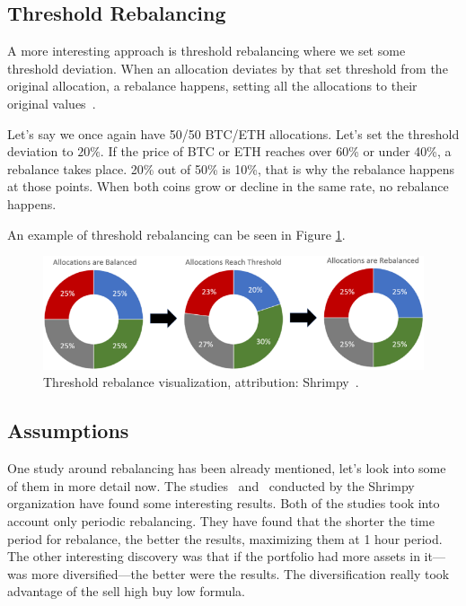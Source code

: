\subsection*{Threshold Rebalancing}
A more interesting approach is threshold rebalancing where we set some threshold deviation. When an allocation deviates by that set threshold from the original allocation, a rebalance happens, setting all the allocations to their original values~\cite{portfolio-rebalancing}.

Let's say we once again have 50/50 BTC/ETH allocations. Let's set the threshold deviation to $20\%$. If the price of BTC or ETH reaches over 60\% or under 40\%, a rebalance takes place. 20\% out of 50\% is 10\%, that is why the rebalance happens at those points. When both coins grow or decline in the same rate, no rebalance happens.

An example of threshold rebalancing can be seen in Figure \ref{threshold-rebalance-figure}.

\begin{figure}[!hbt]
    \centering
    \includegraphics[width=\columnwidth]{figures/threshold-rebalance.png}
    \caption{Threshold rebalance visualization, attribution: Shrimpy~\cite{portfolio-rebalancing}.}
    \label{threshold-rebalance-figure}
\end{figure}

\subsection*{Assumptions}
\label{rebalance-assumptions}
One study around rebalancing has been already mentioned, let's look into some of them in more detail now. The studies~\cite{portfolio-diversity} and~\cite{diversify-perform-better} conducted by the Shrimpy organization have found some interesting results. Both of the studies took into account only periodic rebalancing. They have found that the shorter the time period for rebalance, the better the results, maximizing them at 1 hour period. The other interesting discovery was that if the portfolio had more assets in it---was more diversified---the better were the results. The diversification really took advantage of the sell high buy low formula.


